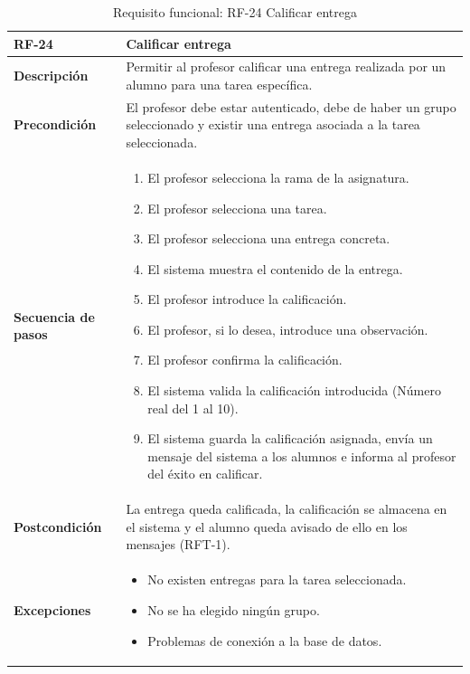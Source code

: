 \begin{table}[H]
\centering
\begin{tabularx}{\textwidth}{
  |>{\centering\arraybackslash}l
  |>{\centering\arraybackslash}X|}
\hline
\textbf{RF-24} & \textbf{Calificar entrega} \\ \hline

\textbf{Descripción} & Permitir al profesor calificar una entrega realizada por un alumno para una tarea específica. \\ \hline

\textbf{Precondición} & El profesor debe estar autenticado, debe de haber un grupo seleccionado y existir una entrega asociada a la tarea seleccionada. \\ \hline

\textbf{Secuencia de pasos} &
\begin{enumerate}
  \item El profesor selecciona la rama de la asignatura.
  \item El profesor selecciona una tarea.
  \item El profesor selecciona una entrega concreta.
  \item El sistema muestra el contenido de la entrega.
  \item El profesor introduce la calificación.
  \item El profesor, si lo desea, introduce una observación.
  \item El profesor confirma la calificación.
  \item El sistema valida la calificación introducida (Número real del 1 al 10).
  \item El sistema guarda la calificación asignada, envía un mensaje del sistema a los alumnos e informa al profesor del éxito en calificar.
\end{enumerate} \\ \hline

\textbf{Postcondición} & La entrega queda calificada, la calificación se almacena en el sistema y el alumno queda avisado de ello en los mensajes (RFT-1). \\ \hline

\textbf{Excepciones} &
\begin{itemize}
  \item No existen entregas para la tarea seleccionada.
  \item No se ha elegido ningún grupo.
  \item Problemas de conexión a la base de datos.
\end{itemize} \\ \hline
\end{tabularx}
\caption{Requisito funcional: RF-24 Calificar entrega}
\label{tab:RF-24}
\end{table}


